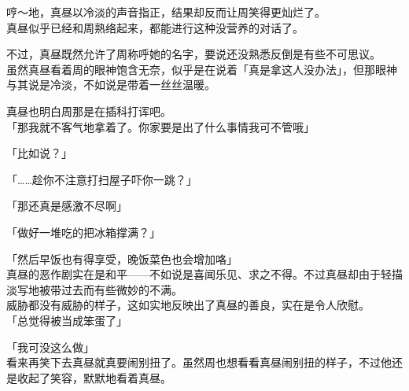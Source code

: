 哼～地，真昼以冷淡的声音指正，结果却反而让周笑得更灿烂了。\\

真昼似乎已经和周熟络起来，都能进行这种没营养的对话了。

不过，真昼既然允许了周称呼她的名字，要说还没熟悉反倒是有些不可思议。\\

虽然真昼看着周的眼神饱含无奈，似乎是在说着「真是拿这人没办法」，但那眼神与其说是冷淡，不如说是带着一丝丝温暖。

真昼也明白周那是在插科打诨吧。\\

「那我就不客气地拿着了。你家要是出了什么事情我可不管哦」

「比如说？」

「……趁你不注意打扫屋子吓你一跳？」

「那还真是感激不尽啊」

「做好一堆吃的把冰箱撑满？」

「然后早饭也有得享受，晚饭菜色也会增加咯」\\

真昼的恶作剧实在是和平——不如说是喜闻乐见、求之不得。不过真昼却由于轻描淡写地被带过去而有些微妙的不满。\\

威胁都没有威胁的样子，这如实地反映出了真昼的善良，实在是令人欣慰。\\

「总觉得被当成笨蛋了」

「我可没这么做」\\

看来再笑下去真昼就真要闹别扭了。虽然周也想看看真昼闹别扭的样子，不过他还是收起了笑容，默默地看着真昼。
